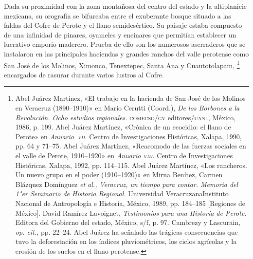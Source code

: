 \documentclass[14pt,twoside,final]{extbook} %
\let\oldfootnote\footnote
\renewcommand\footnote[1]{%
\oldfootnote{\hspace{1mm}#1}}
\begin{document}
Dada su proximidad con la zona montañosa del centro del estado y la altiplanicie mexicana, su orografía se bifurcaba entre el exuberante bosque situado a las faldas del Cofre de Perote y el llano semidesértico. Su paisaje estaba compuesto de una infinidad de pinares, oyameles y encinares que permitían establecer un lucrativo emporio maderero. Prueba de ello son los numerosos aserraderos que se instalaron en las principales haciendas y grandes ranchos del valle perotense como San José de los Molinos, Ximonco, Tenextepec, Santa Ana y Cuautotolapam,\footnote{Abel Juárez Martínez, «El trabajo en la hacienda de San José de los Molinos en Veracruz \mbox{(1890--1910)}» en Mario Cerutti (Coord.), \emph{De los Borbones a la Revolución. Ocho estudios regionales.} \textsc{comecso/gv} editores/\textsc{uanl}, México, 1986, p. 199. Abel Juárez Martínez, «Crónica de un ecocidio: el llano de Perote» en \emph{Anuario~\textsc{vii}.} Centro de Investigaciones Históricas, Xalapa, 1990, pp. 64 y 71--75. Abel Juárez Martínez, «Reacomodo de las fuerzas sociales en el valle de Perote, 1910--1920» en \emph{Anuario \textsc{viii}.} Centro de Investigaciones Históricas, Xalapa, 1992, pp. 114--115. Abel Juárez Martínez, «Los rancheros. Un nuevo grupo en el poder (\mbox{1910--1920})» en Mirna Benítez, Carmen Blázquez Domínguez \emph{et al., Veracruz, un tiempo para contar. Memoria del 1"er Seminario de Historia Regional.} Universidad Veracruzana\kernedslash Instituto Nacional de Antropología e Historia, México, 1989, pp. 184--185 [Regiones de México]. David Ramírez Lavoignet, \emph{Testimonios para una Historia de Perote.} Editora del Gobierno del estado, México, s/f, p. 97. Cambrezy y Lascurain, \emph{op. cit.,} pp. 22--24. Abel Juárez ha señalado las trágicas consecuencias que tuvo la deforestación en los índices pluviométricos, los ciclos agrícolas y la erosión de los suelos en el llano perotense.\index[lugares]{Perote!llano}} encargados de rasurar durante varios lustros al Cofre.\enlargethispage{\baselineskip}
\end{document}
